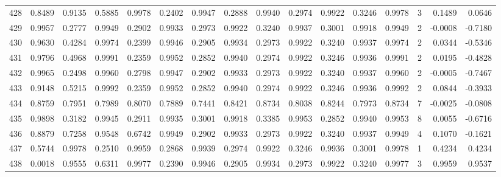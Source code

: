 \begin{tabular}{lrrrrrrrrrrrrrrr}
428 &      0.8489 &  0.9135 &  0.5885 &  0.9978 &  0.2402 &  0.9947 &  0.2888 &  0.9940 &  0.2974 &  0.9922 &   0.3246 &     0.9978 &      3 &                    0.1489 &                     0.0646 \\
429 &      0.9957 &  0.2777 &  0.9949 &  0.2902 &  0.9933 &  0.2973 &  0.9922 &  0.3240 &  0.9937 &  0.3001 &   0.9918 &     0.9949 &      2 &                   -0.0008 &                    -0.7180 \\
430 &      0.9630 &  0.4284 &  0.9974 &  0.2399 &  0.9946 &  0.2905 &  0.9934 &  0.2973 &  0.9922 &  0.3240 &   0.9937 &     0.9974 &      2 &                    0.0344 &                    -0.5346 \\
431 &      0.9796 &  0.4968 &  0.9991 &  0.2359 &  0.9952 &  0.2852 &  0.9940 &  0.2974 &  0.9922 &  0.3246 &   0.9936 &     0.9991 &      2 &                    0.0195 &                    -0.4828 \\
432 &      0.9965 &  0.2498 &  0.9960 &  0.2798 &  0.9947 &  0.2902 &  0.9933 &  0.2973 &  0.9922 &  0.3240 &   0.9937 &     0.9960 &      2 &                   -0.0005 &                    -0.7467 \\
433 &      0.9148 &  0.5215 &  0.9992 &  0.2359 &  0.9952 &  0.2852 &  0.9940 &  0.2974 &  0.9922 &  0.3246 &   0.9936 &     0.9992 &      2 &                    0.0844 &                    -0.3933 \\
434 &      0.8759 &  0.7951 &  0.7989 &  0.8070 &  0.7889 &  0.7441 &  0.8421 &  0.8734 &  0.8038 &  0.8244 &   0.7973 &     0.8734 &      7 &                   -0.0025 &                    -0.0808 \\
435 &      0.9898 &  0.3182 &  0.9945 &  0.2911 &  0.9935 &  0.3001 &  0.9918 &  0.3385 &  0.9953 &  0.2852 &   0.9940 &     0.9953 &      8 &                    0.0055 &                    -0.6716 \\
436 &      0.8879 &  0.7258 &  0.9548 &  0.6742 &  0.9949 &  0.2902 &  0.9933 &  0.2973 &  0.9922 &  0.3240 &   0.9937 &     0.9949 &      4 &                    0.1070 &                    -0.1621 \\
437 &      0.5744 &  0.9978 &  0.2510 &  0.9959 &  0.2868 &  0.9939 &  0.2974 &  0.9922 &  0.3246 &  0.9936 &   0.3001 &     0.9978 &      1 &                    0.4234 &                     0.4234 \\
438 &      0.0018 &  0.9555 &  0.6311 &  0.9977 &  0.2390 &  0.9946 &  0.2905 &  0.9934 &  0.2973 &  0.9922 &   0.3240 &     0.9977 &      3 &                    0.9959 &                     0.9537 \\

\end{tabular}
